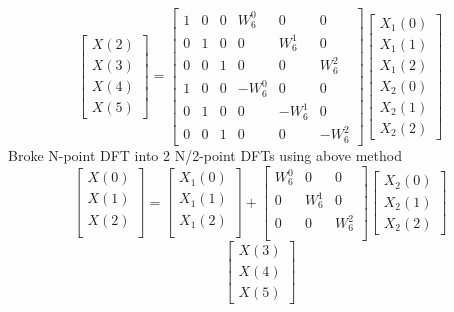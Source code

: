 \documentclass[journal,12pt,twocolumn]{IEEEtran}
\renewcommand\thesection{\arabic{section}}
\begin{document}
\begin{enumerate}[label=\thesection.\arabic*.,ref=\thesection.\theenumi]
\begin{equation}
\begin{bmatrix}
X(2) \\ 
X(3) \\ 
X(4) \\ 
X(5) 
\end{bmatrix}
=
\begin{bmatrix}
1 & 0 & 0 & W^{0}_{6} & 0 & 0\\
0 & 1 & 0 &  0 & W^{1}_{6} & 0\\
0 & 0 & 1 & 0 & 0 & W^{2}_{6}\\
1 & 0 & 0 & -W^{0}_{6} & 0 & 0\\
0 & 1 & 0 & 0 & -W^{1}_{6} & 0\\
0 & 0 & 1 & 0 & 0 & -W^{2}_{6}
\end{bmatrix}
\begin{bmatrix}
X_{1}(0) \\ 
X_{1}(1)\\ 
X_{1}(2)\\ 
X_{2}(0) \\ 
X_{2}(1) \\ 
X_{2}(2)
\end{bmatrix}  
\end{equation}
Broke N-point DFT into 2 N/2-point DFTs using above method
\begin{equation}
\begin{bmatrix}
X(0) \\ 
X(1) \\ 
X(2) \\ 
\end{bmatrix}
=
\begin{bmatrix}
X_{1}(0) \\ 
X_{1}(1)\\ 
X_{1}(2)\\
\end{bmatrix}
+
\begin{bmatrix}
W^{0}_{6} & 0 & 0\\
0 & W^{1}_{6} & 0\\
0 & 0 & W^{2}_{6}\\
\end{bmatrix}
\begin{bmatrix}
X_{2}(0) \\ 
X_{2}(1) \\ 
X_{2}(2)
\end{bmatrix}
\end{equation}
\begin{equation}
\begin{bmatrix}
X(3) \\ 
X(4) \\ 
X(5) 
\end{bmatrix}

\end{equation}
\end{enumerate}
\end{document}
